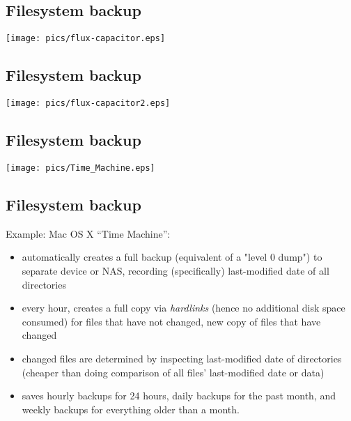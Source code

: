 \documentclass[xga]{xdvislides}
\begin{document}
\subsection{Filesystem backup}
\vspace*{\fill}
\begin{center}
	\texttt{[image: pics/flux-capacitor.eps]}
\end{center}
\vspace*{\fill}

\subsection{Filesystem backup}
\vspace*{\fill}
\begin{center}
	\texttt{[image: pics/flux-capacitor2.eps]}
\end{center}
\vspace*{\fill}

\subsection{Filesystem backup}
\vspace*{\fill}
\begin{center}
	\texttt{[image: pics/Time\_Machine.eps]}
\end{center}
\vspace*{\fill}


\subsection{Filesystem backup}
Example: Mac OS X ``Time Machine'':
\begin{itemize}
	\item automatically creates a full backup (equivalent of a "level 0 dump")
		to separate device or NAS, recording (specifically) last-modified date
		of all directories
	\item every hour, creates a full copy via {\em hardlinks} (hence no
		additional disk space consumed) for files that have not changed,
		new copy of files that have changed
		\item changed files are determined by inspecting last-modified date of
			directories (cheaper than doing comparison of all files'
			last-modified date or data)
	\item saves hourly backups for 24 hours, daily backups for
		the past month, and weekly backups for everything older than a month.
\end{itemize}
\end{document}
